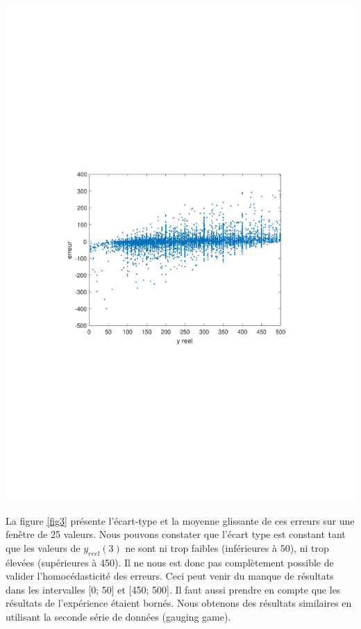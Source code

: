 \documentclass{scrreprt}
\begin{document}
  

\begin{center}
\includegraphics[trim = 3cm 9cm 3cm 9cm, clip]{residu.pdf}
\label{fig2}
\end{center}

 

La figure \ref{fig3} présente l'écart-type et la moyenne glissante de ces erreurs sur une fenêtre de 25 valeurs. Nous pouvons constater que l'écart type est constant tant que les valeurs de $y_{reel}(3)$ ne sont ni trop faibles (inférieures à 50), ni trop élevées (supérieures à 450). Il ne nous est donc pas complètement possible de valider l'homocédasticité des erreurs. Ceci peut venir du manque de résultats dans les intervalles [0; 50] et [450; 500]. Il faut aussi prendre en compte que les résultats de l'expérience étaient bornés. Nous obtenons des résultats similaires en utilisant la seconde série de données (gauging game).\\
\end{document}
